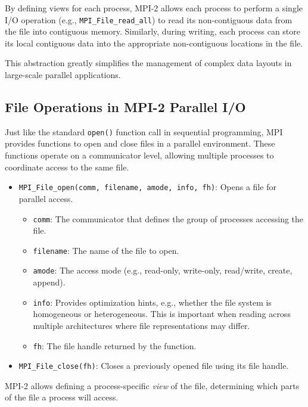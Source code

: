 \documentclass[12pt]{book}
\begin{document}
By defining views for each process, MPI-2 allows each process to perform a single I/O operation (e.g., \texttt{MPI\_File\_read\_all}) to read its non-contiguous data from the file into contiguous memory. Similarly, during writing, each process can store its local contiguous data into the appropriate non-contiguous locations in the file.

This abstraction greatly simplifies the management of complex data layouts in large-scale parallel applications.

\subsection{File Operations in MPI-2 Parallel I/O}

Just like the standard \texttt{open()} function call in sequential programming, MPI provides functions to open and close files in a parallel environment. These functions operate on a communicator level, allowing multiple processes to coordinate access to the same file.

\begin{itemize}
    \item \texttt{MPI\_File\_open(comm, filename, amode, info, fh)}: Opens a file for parallel access.
    \begin{itemize}
        \item \texttt{comm}: The communicator that defines the group of processes accessing the file.
        \item \texttt{filename}: The name of the file to open.
        \item \texttt{amode}: The access mode (e.g., read-only, write-only, read/write, create, append).
        \item \texttt{info}: Provides optimization hints, e.g., whether the file system is homogeneous or heterogeneous. This is important when reading across multiple architectures where file representations may differ.
        \item \texttt{fh}: The file handle returned by the function.
    \end{itemize}
    \item \texttt{MPI\_File\_close(fh)}: Closes a previously opened file using its file handle.
\end{itemize}

MPI-2 allows defining a process-specific \emph{view} of the file, determining which parts of the file a process will access.
\end{document}
